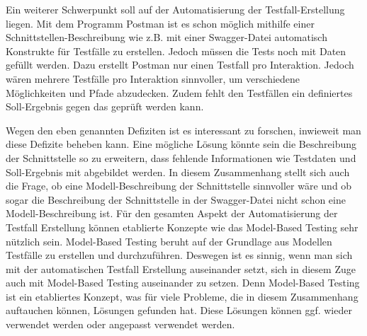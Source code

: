 \documentclass{llncs}
\begin{document}
Ein weiterer Schwerpunkt soll auf der Automatisierung der Testfall-Erstellung liegen. Mit dem Programm Postman ist es schon möglich mithilfe einer Schnittstellen-Beschreibung wie z.B. mit einer Swagger-Datei automatisch Konstrukte für Testfälle zu erstellen. Jedoch müssen die Tests noch mit Daten gefüllt werden. Dazu erstellt Postman nur einen Testfall pro Interaktion. Jedoch wären mehrere Testfälle pro Interaktion sinnvoller, um verschiedene Möglichkeiten und Pfade abzudecken. Zudem fehlt den Testfällen ein definiertes Soll-Ergebnis gegen das geprüft werden kann. 

Wegen den eben genannten Defiziten ist es interessant zu forschen, inwieweit man diese Defizite beheben kann. Eine mögliche Lösung könnte sein die Beschreibung der Schnittstelle so zu erweitern, dass fehlende Informationen wie Testdaten und Soll-Ergebnis mit abgebildet werden. In diesem Zusammenhang stellt sich auch die Frage, ob eine Modell-Beschreibung der Schnittstelle sinnvoller wäre und ob sogar die Beschreibung der Schnittstelle in der Swagger-Datei nicht schon eine Modell-Beschreibung ist. Für den gesamten Aspekt der Automatisierung der Testfall Erstellung können etablierte Konzepte wie das Model-Based Testing sehr nützlich sein. Model-Based Testing beruht auf der Grundlage aus Modellen Testfälle zu erstellen und durchzuführen. Deswegen ist es sinnig, wenn man sich mit der automatischen Testfall Erstellung auseinander setzt, sich in diesem Zuge auch mit Model-Based Testing auseinander zu setzen. Denn Model-Based Testing ist ein etabliertes Konzept, was für viele Probleme, die in diesem Zusammenhang auftauchen können, Lösungen gefunden hat. Diese Lösungen können ggf. wieder verwendet werden oder angepasst verwendet werden. 



\end{document}
